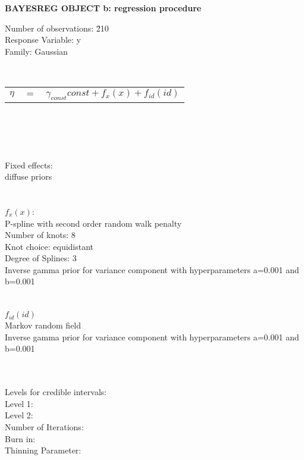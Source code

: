 \documentclass[a4paper, 12pt]{article}
\begin{document}
\begin{center}
\LARGE{\bf BAYESREG OBJECT b: regression procedure}
\end{center} 
\vspace{1cm}

\begin{tabbing}
Number of observations: \= 210\\
Response Variable: \> y\\
Family: \> Gaussian\\
\end{tabbing}

\\


\begin{tabular}{ccp{12cm}}
$\eta$ & $=$ & $\gamma_{const}const + f_{x}(x) + f_{id}(id)$
\end{tabular}
\\ 
\\

\\
\\
Fixed effects:\\
diffuse priors\\
\\\\
$f_{x}(x)$:\\
P-spline with second order random walk penalty\\
Number of knots: 8\\
Knot choice: equidistant\\
Degree of Splines: 3\\
Inverse gamma prior for variance component with hyperparameters a=0.001 and b=0.001\\
\\\\
$f_{id}(id)$\\
Markov random field\\
Inverse gamma prior for variance component with hyperparameters a=0.001 and b=0.001\\
\\\\

\begin{tabbing}
Levels for credible intervals: \= \\
Level 1: \\
Level 2: \\
Number of Iterations: \\
Burn in: \\
Thinning Parameter: 
\end{tabbing}
\vspace{0.5cm}
\end{document}
